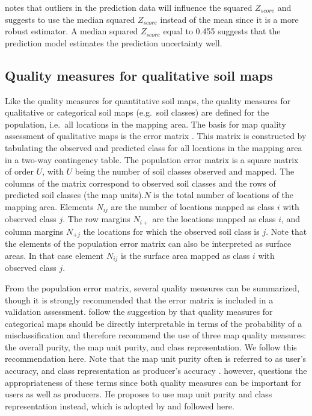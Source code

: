 \documentclass[10pt,b5paper,]{book}
\theoremstyle{definition}
\theoremstyle{definition}
\theoremstyle{definition}
\theoremstyle{remark}
\begin{document}
\citet{lark2000comparison} notes that outliers in the prediction data
will influence the squared \({Z_{score}}\) and suggests to use the
median squared \({Z_{score}}\) instead of the mean since it is a more
robust estimator. A median squared \({Z_{score}}\) equal to 0.455
suggests that the prediction model estimates the prediction uncertainty
well.

\hypertarget{quality-measures-for-qualitative-soil-maps}{%
\subsection{Quality measures for qualitative soil
maps}\label{quality-measures-for-qualitative-soil-maps}}

Like the quality measures for quantitative soil maps, the quality
measures for qualitative or categorical soil maps (e.g.~soil classes)
are defined for the population, i.e.~all locations in the mapping area.
The basis for map quality assessment of qualitative maps is the error
matrix \citep{brus2011sampling, lark1995components}. This matrix is
constructed by tabulating the observed and predicted class for all
locations in the mapping area in a two-way contingency table. The
population error matrix is a square matrix of order \(U\), with \(U\)
being the number of soil classes observed and mapped. The columns of the
matrix correspond to observed soil classes and the rows of predicted
soil classes (the map units).\(N\) is the total number of locations of
the mapping area. Elements \(N_{ij}\) are the number of locations mapped
as class \(i\) with observed class \(j\). The row margins \(N_{i+}\) are
the locations mapped as class \(i\), and column margins \(N_{+j}\) the
locations for which the observed soil class is \(j\). Note that the
elements of the population error matrix can also be interpreted as
surface areas. In that case element \(N_{ij}\) is the surface area
mapped as class \(i\) with observed class \(j\).

From the population error matrix, several quality measures can be
summarized, though it is strongly recommended that the error matrix is
included in a validation assessment. \citet{brus2011sampling} follow the
suggestion by \citet{stehman1997selecting} that quality measures for
categorical maps should be directly interpretable in terms of the
probability of a misclassification and therefore recommend the use of
three map quality measures: the overall purity, the map unit purity, and
class representation. We follow this recommendation here. Note that the
map unit purity often is referred to as user's accuracy, and class
representation as producer's accuracy
\citep{stehman1997selecting, adhikari2014constructing}.
\citet{lark1995components} however, questions the appropriateness of
these terms since both quality measures can be important for users as
well as producers. He proposes to use map unit purity and class
representation instead, which is adopted by \citet{brus2011sampling} and
followed here.
\end{document}
